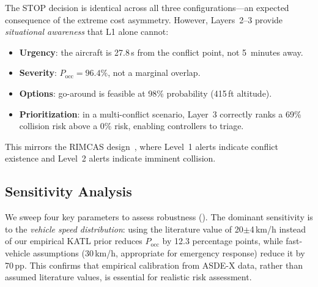 \documentclass[11pt,a4paper]{article}
\begin{document}
The STOP decision is identical across all three configurations---an expected consequence of the extreme cost asymmetry.
However, Layers~2--3 provide \emph{situational awareness} that L1 alone cannot:
\begin{itemize}[nosep]
    \item \textbf{Urgency}: the aircraft is 27.8\,s from the conflict point, not 5~minutes away.
    \item \textbf{Severity}: $P_{\mathrm{occ}} = 96.4\%$, not a marginal overlap.
    \item \textbf{Options}: go-around is feasible at 98\% probability (415\,ft altitude).
    \item \textbf{Prioritization}: in a multi-conflict scenario, Layer~3 correctly ranks a 69\% collision risk above a 0\% risk, enabling controllers to triage.
\end{itemize}
This mirrors the RIMCAS design~\citep{eurocontrol2010rimcas}, where Level~1 alerts indicate conflict existence and Level~2 alerts indicate imminent collision.

\subsection{Sensitivity Analysis}
\label{sec:sensitivity}

We sweep four key parameters to assess robustness ().
The dominant sensitivity is to the \emph{vehicle speed distribution}: using the literature value of 20$\pm$4\,km/h instead of our empirical KATL prior reduces $P_{\mathrm{occ}}$ by 12.3 percentage points, while fast-vehicle assumptions (30\,km/h, appropriate for emergency response) reduce it by 70\,pp.
This confirms that empirical calibration from ASDE-X data, rather than assumed literature values, is essential for realistic risk assessment.
\end{document}
